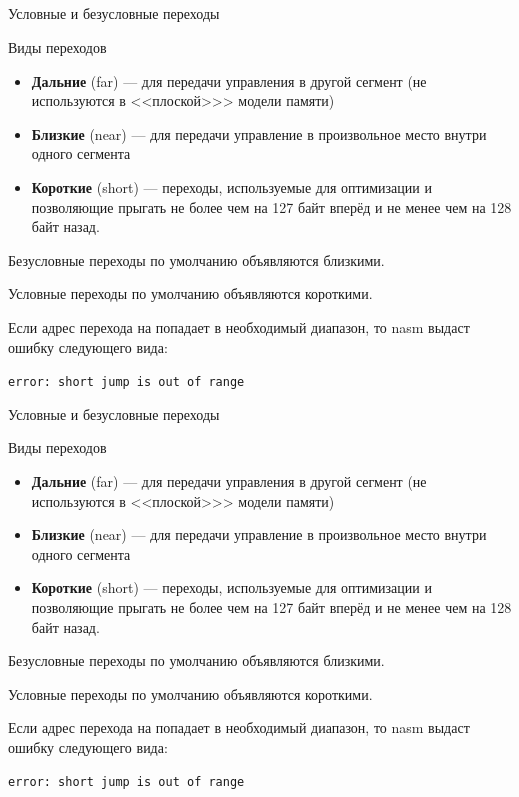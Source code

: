 \documentclass{beamer}
\begin{document}
    \subsection{}
    \begin{frame}{Условные и безусловные переходы}
        \begin{block}{Виды переходов}
            \begin{itemize}
                \item {\bf Дальние} (far) --- для передачи управления в другой сегмент (не используются в <<плоской>>> модели памяти)
                \item {\bf Близкие} (near) --- для передачи управление в произвольное место внутри одного сегмента
                \item {\bf  Короткие} (short) --- переходы, используемые для оптимизации и позволяющие прыгать не более чем на 127 байт вперёд и не менее чем на 128 байт назад.
             \end{itemize}
        \end{block}
        Безусловные переходы по умолчанию объявляются близкими.

        Условные переходы по умолчанию объявляются короткими. 

        Если адрес перехода на попадает в необходимый диапазон, то nasm выдаст ошибку следующего вида:

        {\tt error: short jump is out of range}
    \end{frame}
    \begin{frame}{Условные и безусловные переходы}
        \begin{block}{Виды переходов}
            \begin{itemize}
                \item {\bf Дальние} (far) --- для передачи управления в другой сегмент (не используются в <<плоской>>> модели памяти)
                \item {\bf Близкие} (near) --- для передачи управление в произвольное место внутри одного сегмента
                \item {\bf  Короткие} (short) --- переходы, используемые для оптимизации и позволяющие прыгать не более чем на 127 байт вперёд и не менее чем на 128 байт назад.
             \end{itemize}
        \end{block}
        Безусловные переходы по умолчанию объявляются близкими.

        Условные переходы по умолчанию объявляются короткими. 

        Если адрес перехода на попадает в необходимый диапазон, то nasm выдаст ошибку следующего вида:

        {\tt error: short jump is out of range}
    \end{frame}
\end{document}
